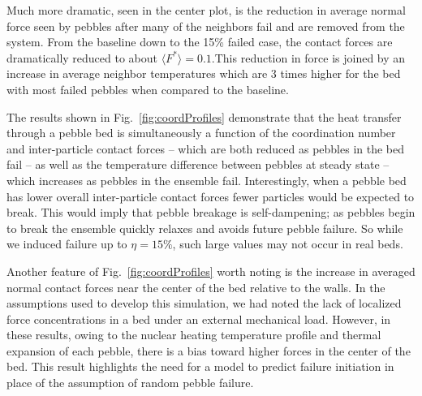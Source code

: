 Much more dramatic, seen in the center plot, is the reduction in average normal force seen by pebbles after many of the neighbors fail and are removed from the system. From the baseline down to the 15\% failed case, the contact forces are dramatically reduced to about $\langle F^* \rangle=0.1$.This reduction in force is joined by an increase in average neighbor temperatures which are 3 times higher for the bed with most failed pebbles when compared to the baseline. 

The results shown in Fig.~\ref{fig:coordProfiles} demonstrate that the heat transfer through a pebble bed is simultaneously a function of the coordination number and inter-particle contact forces -- which are both reduced as pebbles in the bed fail -- as well as the temperature difference between pebbles at steady state -- which increases as pebbles in the ensemble fail. Interestingly, when a pebble bed has lower overall inter-particle contact forces fewer particles would be expected to break. This would imply that pebble breakage is self-dampening; as pebbles begin to break the ensemble quickly relaxes and avoids future pebble failure. So while we induced failure up to $\eta = 15\%$, such large values may not occur in real beds. 

Another feature of Fig.~\ref{fig:coordProfiles} worth noting is the increase in averaged normal contact forces near the center of the bed relative to the walls. In the assumptions used to develop this simulation, we had noted the lack of localized force concentrations in a bed under an external mechanical load. However, in these results, owing to the nuclear heating temperature profile and thermal expansion of each pebble, there is a bias toward higher forces in the center of the bed. This result highlights the need for a model to predict failure initiation in place of the assumption of random pebble failure. 

